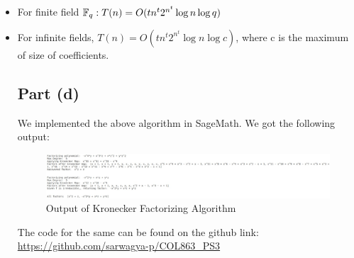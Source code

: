 \begin{itemize}
    \item For finite field $\mathbb{F}_q: T(n) = O(t n^t 2^{n^t} \log n \log q)$
    \item For infinite fields, $T(n) = O(t n^t 2^{n^t} \log n \log c)$, where c is the maximum of size of coefficients.

\subsection{Part (d)}
We implemented the above algorithm in SageMath. We got the following output:

\begin{figure}[h]
    \centering
    \includegraphics[scale=0.5]{Assignment3 Files/q5b.jpeg}
    \caption{Output of Kronecker Factorizing Algorithm}
    \label{fig:enter-label}
\end{figure}

The code for the same can be found on the github link: 
\href{https://github.com/sarwagya-p/COL863_PS3}{https://github.com/sarwagya-p/COL863\_PS3}
\end{itemize}
